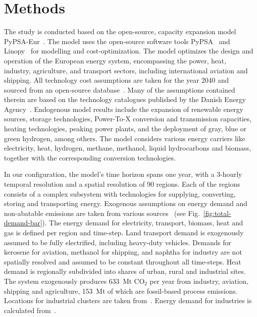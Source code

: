 \documentclass[twocolumn]{article}
\newcommand{\carbon}{CO$_2$}
\begin{document}
\section*{Methods}
\label{sec:methodology}

The study is conducted based on the open-source, capacity expansion model PyPSA-Eur~\cite{horschPyPSAEurOpenOptimisation2018,brownSynergiesSectorCoupling2018,PyPSAEurSecSectorCoupledOpen2023}.
The model uses the open-source software tools PyPSA~\cite{brownPyPSAPythonPower2018} and Linopy~\cite{hofmannLinopyLinearOptimization2023}
for modelling and cost-optimization.
The model optimizes the design and operation of the European energy system, encompassing the power, heat, industry, agriculture, and transport sectors, including international aviation and shipping.
All technology cost assumptions are taken for the year 2040 and sourced from an open-source database~\cite{lisazeyenPyPSATechnologydataTechnology2023}.
Many of the assumptions contained therein are based on the technology catalogues published by the Danish Energy Agency~\cite{danishenergyagencyTechnologyDataGeneration2019,thedanishenergyagencyTechnologyDataCarbon2023}.
Endogenous model results include the expansion of renewable energy sources, storage technologies, Power-To-X conversion and transmission capacities, heating technologies, peaking power plants, and the deployment of gray, blue or green hydrogen, among others.
The model considers various energy carriers like electricity, heat, hydrogen, methane, methanol, liquid hydrocarbons and biomass, together with the corresponding conversion technologies.



%
In our configuration, the model's time horizon spans one year, with a 3-hourly temporal resolution and a spatial resolution of 90 regions. Each of the regions consists of a complex subsystem with technologies for supplying, converting, storing and transporting energy. Exogenous assumptions on energy demand and non-abatable emissions are taken from various sources~\cite{piamanzGeoreferencedIndustrialSites2018,muehlenpfordtTimeSeries2019,mantzosJRCIDEES20152018,NationalEmissionsReported2023,EurostatCompleteEnergyBalance,uwekrienDemandlib2023} (see Fig.~\ref{fig:total-demand-bar}). The energy demand for electricity, transport, biomass, heat and gas is defined per region and time-step.
Land transport demand is exogenously assumed to be fully electrified, including heavy-duty vehicles.
Demands for kerosene for aviation, methanol for shipping, and naphtha for industry are not spatially resolved and assumed to be constant throughout all time-steps.
Heat demand is regionally subdivided into shares of urban, rural and industrial sites.
The system exogenously produces 633~Mt \carbon{} per year from industry, aviation, shipping and agriculture, 153~Mt of which are fossil-based process emissions.
Locations for industrial clusters are taken from~\cite{hotmaps_industrial_db}. Energy demand for industries is calculated from~\cite{mantzosJRCIDEES20152018}.
\end{document}
